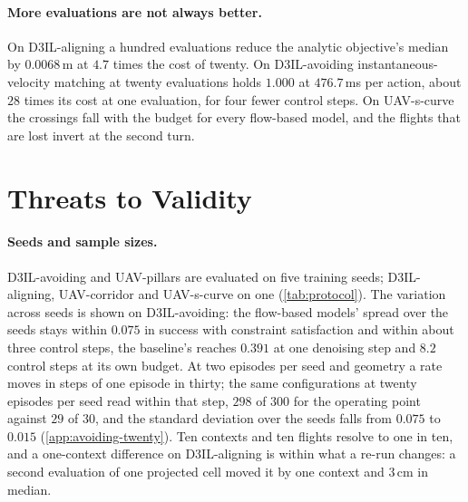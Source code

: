 \paragraph{More evaluations are not always better.} On D3IL-aligning a hundred evaluations reduce the
analytic objective's median by $0.0068$\,m at $4.7$ times the cost of twenty. On D3IL-avoiding
instantaneous-velocity matching at twenty evaluations holds $1.000$ at $476.7$\,ms per action, about
$28$ times its cost at one evaluation, for four fewer control steps. On UAV-s-curve the crossings fall
with the budget for every flow-based model, and the flights that are lost invert at the second turn.

\section{Threats to Validity}\label{sec:disc:threats}

\paragraph{Seeds and sample sizes.} D3IL-avoiding and UAV-pillars are evaluated on five training
seeds; D3IL-aligning, UAV-corridor and UAV-s-curve on one (\autoref{tab:protocol}). The variation
across seeds is shown on D3IL-avoiding: the flow-based models' spread over the seeds stays within
$0.075$ in success with constraint satisfaction and within about three control steps, the baseline's
reaches $0.391$ at one denoising step and $8.2$ control steps at its own budget. At two episodes per
seed and geometry a rate moves in steps of one episode in thirty; the same configurations at twenty
episodes per seed read within that step, $298$ of $300$ for the operating point against $29$ of $30$,
and the standard deviation over the seeds falls from $0.075$ to $0.015$ (\autoref{app:avoiding-twenty}).
Ten contexts and ten flights resolve to one in ten, and a one-context difference on D3IL-aligning is
within what a re-run changes: a second evaluation of one projected cell moved it by one context and
$3$\,cm in median.

